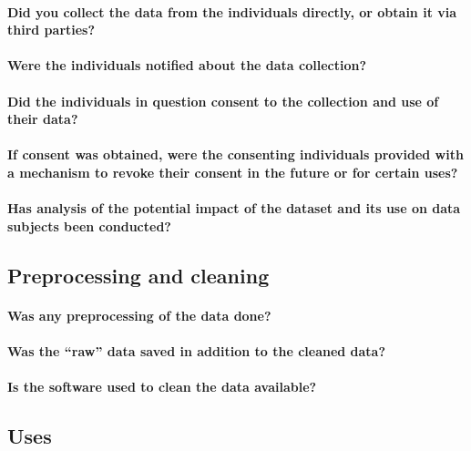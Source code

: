 \paragraph{Did you collect the data from the individuals directly, or obtain it via third parties?}

\paragraph{Were the individuals notified about the data collection?}

\paragraph{Did the individuals in question consent to the collection and use of their data?}

\paragraph{If consent was obtained, were the consenting individuals provided with a mechanism to revoke their consent in the future or for certain uses?}

\paragraph{Has analysis of the potential impact of the dataset and its use on data subjects been conducted?}

\subsection{Preprocessing and cleaning}

\paragraph{Was any preprocessing of the data done?}

\paragraph{Was the ``raw'' data saved in addition to the cleaned data?}

\paragraph{Is the software used to clean the data available?}

\subsection{Uses}


